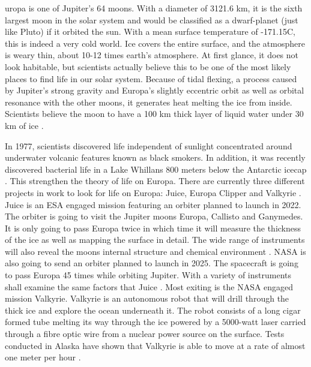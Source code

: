 \begin{multicols}{2}

 
uropa is one of Jupiter's 64 moons.
With a diameter of 3121.6 km, it is the sixth largest moon in the solar system and would be classified as a dwarf-planet (just like Pluto) if it orbited the sun.
With a mean surface temperature of -171.15\degree C, this is indeed a very cold world.
Ice covers the entire surface, and the atmosphere is weary thin, about 10-12 times earth's atmosphere.
At first glance, it does not look habitable, but scientists actually believe this to be one of the most likely places to find life in our solar system.
Because of tidal flexing, a process caused by Jupiter’s strong gravity and Europa’s slightly eccentric orbit as well as orbital resonance with the other moons, it generates heat melting the ice from inside.
Scientists believe the moon to have a 100 km thick layer of liquid water under 30 km of ice \cite{FPlan03} \cite{FPlan24}.
 
In 1977, scientists discovered life independent of sunlight concentrated around underwater volcanic features known as black smokers.
In addition, it was recently discovered bacterial life in a Lake Whillans 800 meters below the Antarctic icecap \cite{FPlan04}. This strengthen the theory of life on Europa.
There are currently three different projects in work to look for life on Europa: Juice, Europa Clipper and Valkyrie \cite{FPlan24}.
Juice is an ESA engaged mission featuring an orbiter planned to launch in 2022.
The orbiter is going to visit the Jupiter moons Europa, Callisto and Ganymedes.
It is only going to pass Europa twice in which time it will measure the thickness of the ice as well as mapping the surface in detail.
The wide range of instruments will also reveal the moons internal structure and chemical environment \cite{FPlan24}.
NASA is also going to send an orbiter planned to launch in 2025.
The spacecraft is going to pass Europa 45 times while orbiting Jupiter.
With a variety of instruments shall examine the same factors that Juice \cite{FPlan24}.
Most exiting is the NASA engaged mission Valkyrie.
Valkyrie is an autonomous robot that will drill through the thick ice and explore the ocean underneath it.
The robot consists of a long cigar formed tube melting its way through the ice powered by a 5000-watt laser carried through a fibre optic wire from a nuclear power source on the surface.
Tests conducted in Alaska have shown that Valkyrie is able to move at a rate of almost one meter per hour \cite{FPlan24} \cite{FPlan25}.


\end{multicols}
